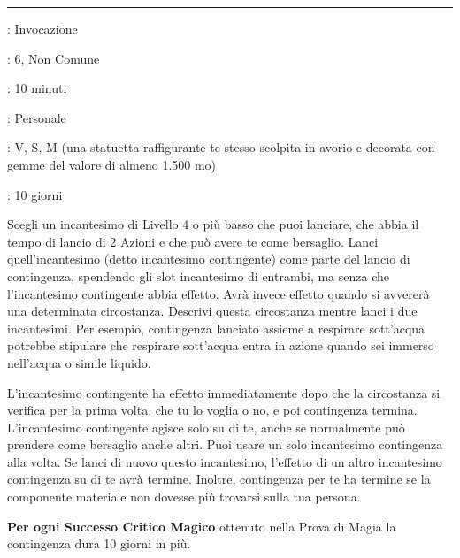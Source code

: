 \begin{multicols}{2}
\smallskip\noindent\rule{\linewidth}{2pt} \hypertarget{Contingenza}{}\smallskip{}
\noindent
\begin{description}[noitemsep, topsep=0pt, parsep=0pt, partopsep=0pt, leftmargin=0cm, labelwidth=2.8cm]
	\item[\textbf{Lista di Magia}]: Invocazione
	\item[\textbf{Livello}]: 6, Non Comune
	\item[\textbf{T. di Lancio}]: 10 minuti
	\item[\textbf{Gittata}]: Personale
	\item[\textbf{Componenti}]: V, S, M (una statuetta raffigurante te stesso scolpita in avorio e decorata con gemme del valore di almeno 1.500 mo)
	\item[\textbf{Durata}]: 10 giorni
\end{description}

Scegli un incantesimo di Livello 4 o più basso che puoi lanciare, che abbia il tempo di lancio di 2 Azioni e che può avere te come bersaglio. Lanci quell'incantesimo (detto incantesimo contingente) come parte del lancio di contingenza, spendendo gli slot incantesimo di entrambi, ma senza che l'incantesimo contingente abbia effetto. Avrà invece effetto quando si avvererà una determinata circostanza. Descrivi questa circostanza mentre lanci i due incantesimi. Per esempio, contingenza lanciato assieme a respirare sott'acqua potrebbe stipulare che respirare sott'acqua entra in azione quando sei immerso nell'acqua o simile liquido.

L'incantesimo contingente ha effetto immediatamente dopo che la circostanza si verifica per la prima volta, che tu lo voglia o no, e poi contingenza termina. L'incantesimo contingente agisce solo su di te, anche se normalmente può prendere come bersaglio anche altri. Puoi usare un solo incantesimo contingenza alla volta. Se lanci di nuovo questo incantesimo, l'effetto di un altro incantesimo contingenza su di te avrà termine. Inoltre, contingenza per te ha termine se la componente materiale non dovesse più trovarsi sulla tua persona.

\textbf{Per ogni Successo Critico Magico} ottenuto nella Prova di Magia la contingenza dura 10 giorni in più.


\end{multicols}
